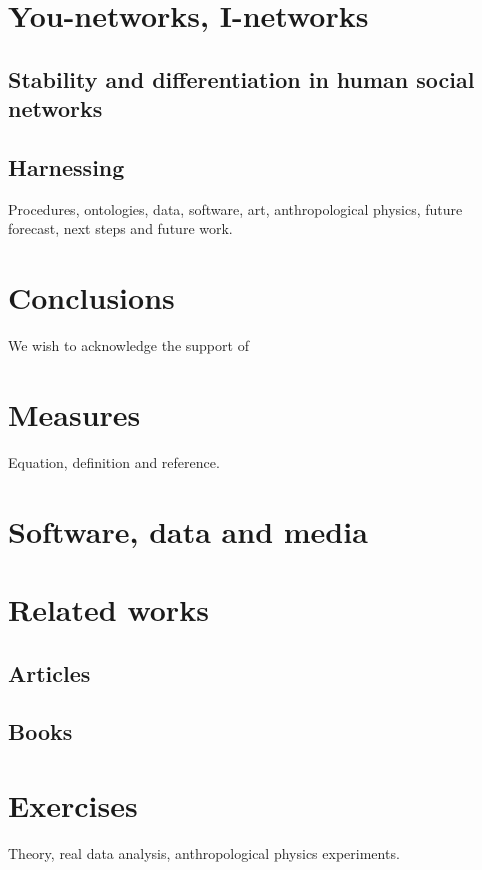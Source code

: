 \documentclass[%
 aip,
 jmp,%
 amsmath,amssymb,
 reprint,%
]{revtex4-1}
\begin{document}
\section{\label{sec:inet}You-networks, I-networks}
\subsection{\label{sec:stabdiff}Stability and differentiation in human social networks}
\subsection{\label{sec:harn}Harnessing}
Procedures, ontologies, data, software, art, anthropological physics, 
future forecast, next steps and future work.

\section{\label{sec:conc}Conclusions}

\begin{acknowledgments}
We wish to acknowledge the support of 
\end{acknowledgments}

\appendix

\section{Measures}
Equation, definition and reference.

\section{Software, data and media}
\section{Related works}
\subsection{Articles}
\subsection{Books}
\section{Exercises}
Theory, real data analysis, anthropological physics experiments.


\nocite{*}
\end{document}
